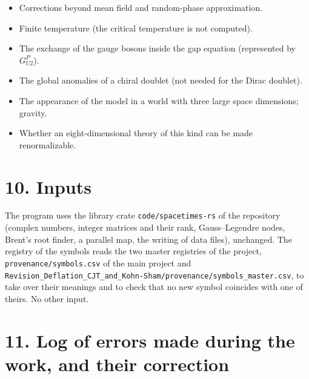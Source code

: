\documentclass[
  10pt,
]{article}
\providecommand{\tightlist}{%
  \setlength{\itemsep}{0pt}\setlength{\parskip}{0pt}}
\begin{document}
\begin{itemize}
\tightlist
\item
  Corrections beyond mean field and random-phase approximation.
\item
  Finite temperature (the critical temperature is not computed).
\item
  The exchange of the gauge bosons inside the gap equation (represented
  by \(G^P_{U2}\)).
\item
  The global anomalies of a chiral doublet (not needed for the Dirac
  doublet).
\item
  The appearance of the model in a world with three large space
  dimensions; gravity.
\item
  Whether an eight-dimensional theory of this kind can be made
  renormalizable.
\end{itemize}

\hypertarget{inputs}{%
\section{10. Inputs}\label{inputs}}

The program uses the library crate \texttt{code/spacetimes-rs} of the
repository (complex numbers, integer matrices and their rank,
Gauss--Legendre nodes, Brent's root finder, a parallel map, the writing
of data files), unchanged. The registry of the symbols reads the two
master registries of the project, \texttt{provenance/symbols.csv} of the
main project and
\texttt{Revision\_Deflation\_CJT\_and\_Kohn-Sham/provenance/symbols\_master.csv},
to take over their meanings and to check that no new symbol coincides
with one of theirs. No other input.

\hypertarget{log-of-errors-made-during-the-work-and-their-correction}{%
\section{11. Log of errors made during the work, and their
correction}\label{log-of-errors-made-during-the-work-and-their-correction}}
\end{document}
